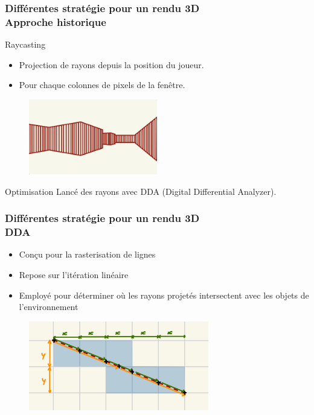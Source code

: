 \documentclass{beamer}
\begin{document}
\begin{frame}
    \frametitle{Différentes stratégie pour un rendu 3D \\
                \small Approche historique}
    \begin{block}{Raycasting}
        \begin{itemize}
            \item Projection de rayons depuis la position du joueur.
            \item Pour chaque colonnes de pixels de la fenêtre.
        \end{itemize}
    \end{block}
    \begin{figure}
        \centering
        \includegraphics[width=0.5\textwidth]{images/rendu-historique.jpg}
    \end{figure}
    \vspace*{-5mm}
    \begin{block}{Optimisation} 
        Lancé des rayons avec DDA (Digital Differential Analyzer).
    \end{block}
\end{frame}

\begin{frame}
    \frametitle{Différentes stratégie pour un rendu 3D \\
                \small DDA}           
    \begin{block}{}
        \begin{itemize}
            \item Conçu pour la rasterisation de lignes
            \item Repose sur l'itération linéaire
            \item Employé pour déterminer où les rayons projetés intersectent avec les objets de l'environnement
        \end{itemize}
    \end{block}    
    \begin{figure}
        \centering
        \includegraphics[width=0.7\textwidth]{images/DDA.jpg}
    \end{figure}
\end{frame}
\end{document}
